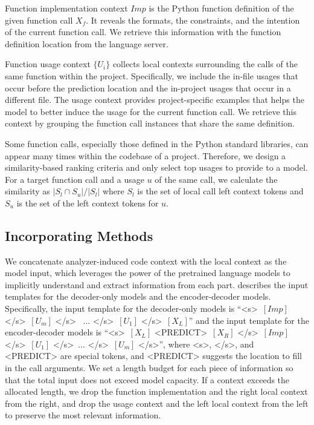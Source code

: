 Function implementation context $Imp$ is the Python function definition of the given function call $X_f$. 
It reveals the formats, the constraints, and the intention of the current function call.  
We retrieve this information with the function definition location from the language server.

Function usage context $\{U_i\}$ collects local contexts surrounding the calls of the same function within the project. 
Specifically, we include the in-file usages that occur before the prediction location and the in-project usages that occur in a different file.
The usage context provides project-specific examples that helps the model to better induce the usage for the current function call. 
We retrieve this context by grouping the function call instances that share the same definition.

Some function calls, especially those defined in the Python standard libraries, can appear many times within the codebase of a project. 
Therefore, we design a similarity-based ranking criteria and only select top usages to provide to a model. 
For a target function call and a usage $u$ of the same call, we calculate the similarity as $ |S_l \cap S_{u}| / |S_l| $ where $S_l$ is the set of local call left context tokens and $S_{u}$ is the set of the left context tokens for $u$.

\subsection{Incorporating Methods}
\label{sec:method-incorporating}




We concatenate analyzer-induced code context with the local context as the model input, which leverages the power of the pretrained language models to implicitly understand and extract information from each part. 
\ifaaai
{} describes the input templates for the decoder-only models and the encoder-decoder models.
\fi
\ifamlc
Specifically, the input template for the decoder-only models is
``\textless{}s\textgreater~{$[Imp]$} \textless{}/s\textgreater~$[U_m]$ \textless{}/s\textgreater~ ... \textless{}/s\textgreater~$[U_1]$ \textless{}/s\textgreater~$[X_L]$''
and the input template for the encoder-decoder models is
``\textless{}s\textgreater~$[X_L]$  \textless{}PREDICT\textgreater~$[X_R]$ \textless{}/s\textgreater~{$[Imp]$} \textless{}/s\textgreater~$[U_1]$ \textless{}/s\textgreater~... \textless{}/s\textgreater~$[U_m]$ \textless{}/s\textgreater{}'',
where 
\textless{}s\textgreater{}, \textless{}/s\textgreater{}, and \textless{}PREDICT\textgreater{} are special tokens, and \textless{}PREDICT\textgreater{} suggests the location to fill in the call arguments.
\fi
We set a length budget for each piece of information so that the total input does not exceed model capacity.
If a context exceeds the allocated length, we drop the function implementation and the right local context from the right, and drop the usage context and the left local context from the left
to preserve the most relevant information.

